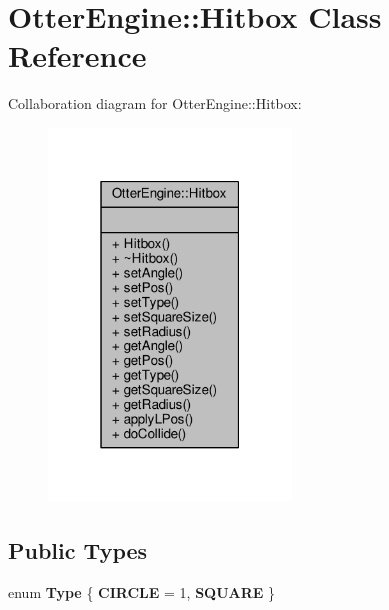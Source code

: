 \hypertarget{class_otter_engine_1_1_hitbox}{}\section{Otter\+Engine\+:\+:Hitbox Class Reference}
\label{class_otter_engine_1_1_hitbox}


Collaboration diagram for Otter\+Engine\+:\+:Hitbox\+:\nopagebreak
\begin{figure}[H]
\begin{center}
\leavevmode
\includegraphics[width=183pt]{d0/dd3/class_otter_engine_1_1_hitbox__coll__graph}
\end{center}
\end{figure}
\subsection*{Public Types}
\begin{DoxyCompactItemize}
\item 
enum {\bfseries Type} \{ {\bfseries C\+I\+R\+C\+LE} = 1, 
{\bfseries S\+Q\+U\+A\+RE}
 \}\hypertarget{class_otter_engine_1_1_hitbox_a1c7cbfc1efae877484ab99044a7af962}{}\label{class_otter_engine_1_1_hitbox_a1c7cbfc1efae877484ab99044a7af962}

\end{DoxyCompactItemize}

